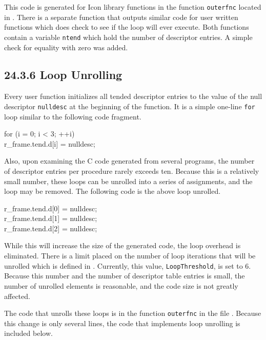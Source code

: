 This code is generated for Icon library functions in the function
\texttt{outerfnc} located in . There is a separate
function that outputs similar code for user written functions which
does check to see if the loop will ever execute. Both functions
contain a variable \texttt{ntend} which hold the number of descriptor
entries. A simple check for equality with zero was added.

\subsection[24.3.6 Loop Unrolling]{24.3.6 Loop Unrolling}

Every user function initializes all tended descriptor entries to the
value of the null descriptor \texttt{nulldesc} at the beginning of the
function. It is a simple one-line \texttt{for} loop similar to the
following code fragment.

\goodbreak
\begin{iconcode}
for (i = 0; i < 3; ++i)\\
\>r\_frame.tend.d[i] = nulldesc;\\
\end{iconcode}


Also, upon examining the C code generated from several programs, the
number of descriptor entries per procedure rarely exceeds ten. Because
this is a relatively small number, these loops can be unrolled into a
series of assignments, and the loop may be removed. The following code
is the above loop unrolled.

\goodbreak
\begin{iconcode}
r\_frame.tend.d[0] = nulldesc;\\
r\_frame.tend.d[1] = nulldesc;\\
r\_frame.tend.d[2] = nulldesc;\\
\end{iconcode}

While this will increase the size of the generated code, the loop
overhead is eliminated. There is a limit placed on the number of loop
iterations that will be unrolled which is defined in
. Currently, this value, \texttt{LoopThreshold}, is
set to 6. Because this number and the number of descriptor table
entries is small, the number of unrolled elements is reasonable, and
the code size is not greatly affected.


The code that unrolls these loops is in the function \texttt{outerfnc}
in the file . Because this change is only several
lines, the code that implements loop unrolling is included below.

